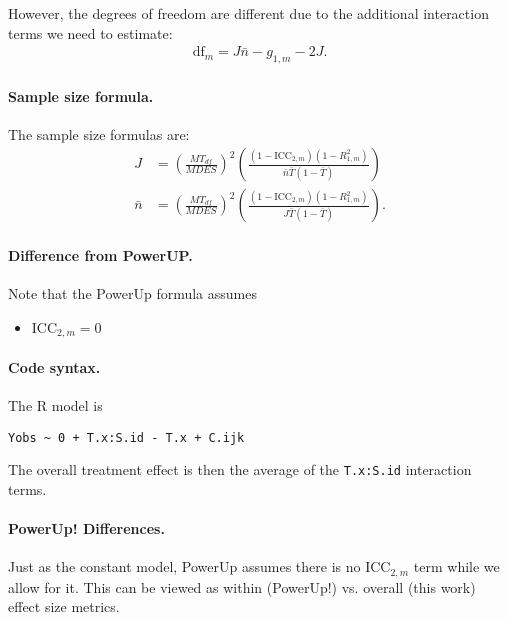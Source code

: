 \documentclass[12pt]{article}
\begin{document}
However, the degrees of freedom are different due to the additional interaction terms we need to estimate:
\begin{align}\text{df}_m = J \bar{n} - g_{1,m} - 2J.\end{align}

\paragraph{Sample size formula.} 
The sample size formulas are:
\begin{align}
J &= \left(\frac{MT_{df}}{MDES}\right)^2 \left(\frac{(1-\text{ICC}_{2,m})(1-R^2_{1,m})}{\bar{n} \bar{T} (1 - \bar{T})} \right)\\
\bar{n} &= \left(\frac{MT_{df}}{MDES}\right)^2 \left(\frac{(1-\text{ICC}_{2,m})(1-R^2_{1,m})}{J \bar{T} (1 - \bar{T})} \right) .
\end{align}

\paragraph{Difference from PowerUP.}

Note that the PowerUp formula assumes
\begin{itemize}
\item $\text{ICC}_{2,m} = 0$
\end{itemize}

\paragraph{Code syntax.}
The R model is
\begin{verbatim}
Yobs ~ 0 + T.x:S.id - T.x + C.ijk
\end{verbatim}
The overall treatment effect is then the average of the \texttt{T.x:S.id} interaction terms.

\paragraph{PowerUp! Differences.}
Just as the constant model, PowerUp assumes there is no $\text{ICC}_{2,m}$ term while we allow for it.
This can be viewed as within (PowerUp!) vs. overall (this work) effect size metrics.



\newpage 
\end{document}
